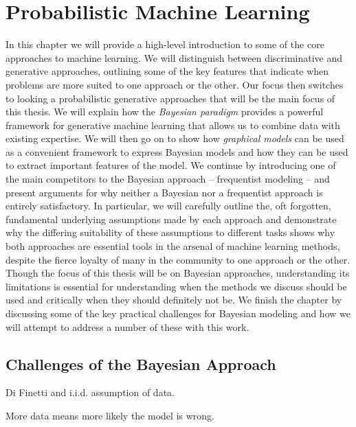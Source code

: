 %
%	


\chapter{Probabilistic Machine Learning}
\label{chp:bayes}

In this chapter we will provide a high-level introduction to  some of the core approaches to
machine learning.  We will distinguish between discriminative and generative approaches,
outlining some of the key features that indicate when problems are more suited to one approach
or the other.  Our focus then switches to looking a probabilistic generative approaches that
will be the main focus of this thesis.  We will explain how the \emph{Bayesian paradigm} provides
a powerful framework for generative machine learning that allows us to combine data with existing
expertise.  We will then go on to show how \emph{graphical models} can be used as a convenient
framework to express Bayesian models and how they can be used to extract important features of the
model.  We continue by introducing one of the main competitors to the Bayesian approach -- frequentist
modeling -- and present arguments for why neither a Bayesian nor a frequentist approach is
entirely satisfactory.  In particular, we will carefully outline the, oft forgotten, fundamental underlying
assumptions made by each approach and demonstrate why the differing suitability of these assumptions
to different tasks shows why both approaches are essential tools in the arsenal of machine learning
methods, despite the fierce loyalty of many in the community to one approach or the other.
Though the focus of this thesis will be on Bayesian approaches, understanding its limitations
is essential for understanding when the methods we discuss should be used and critically when they
should definitely not be.  We finish the chapter by discussing some of the key practical challenges
for Bayesian modeling and how we will attempt to address a number of these with this work.







\section{Challenges of the Bayesian Approach}
\label{sec:bayes:challenges}

Di Finetti and i.i.d. assumption of data.

More data means more likely the model is wrong.